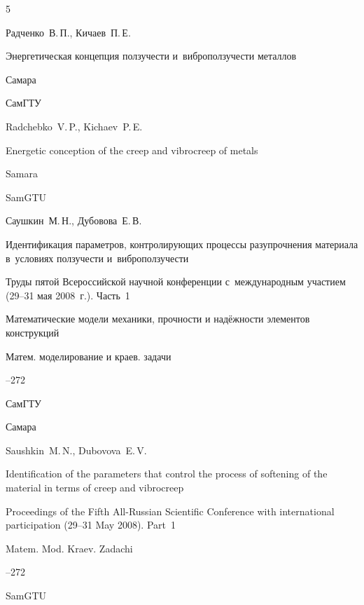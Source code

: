 \begin{thebibliography}{5}

\by Радченко~В.\,П., Кичаев~П.\,Е.

\book Энергетическая концепция ползучести и~виброползучести металлов

\publaddr Самара

\publ СамГТУ



\misctransl

\by Radchebko~V.\,P., Kichaev~P.\,E. 

\book Energetic conception of the creep and  vibrocreep of metals

\publaddr Samara

\publ SamGTU








\by Саушкин~М.\,Н., Дубовова~Е.\,В.

\paper Идентификация параметров, контролирующих процессы разупрочнения материала в~условиях ползучести и~виброползучести

\inbook Труды пятой Всероссийской научной конференции с~международным участием \rm (29--31 мая 2008~г.). Часть~1

\bookinfo Математические модели механики, прочности и надёжности элементов конструкций

\serial Матем. моделирование и краев. задачи


--272

\publ СамГТУ

\publaddr Самара

\misctransl

\by Saushkin~M.\,N., Dubovova~E.\,V.

\paper Identification of the parameters that control the process of softening of the material in terms of creep and vibrocreep

\inbook Proceedings of the Fifth All-Russian Scientific Conference with international participation \rm (29--31 May 2008). Part~1

\serial Matem. Mod. Kraev. Zadachi


--272

\publ SamGTU


\end{thebibliography}
